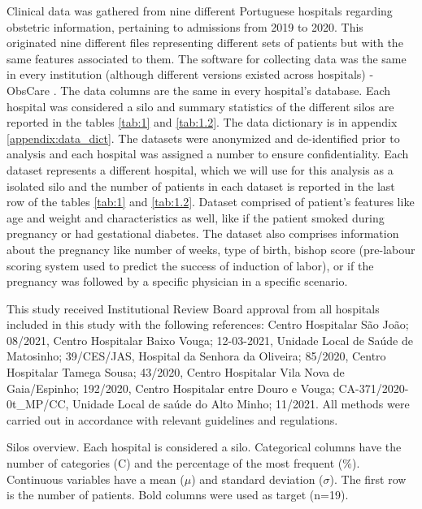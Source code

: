 
Clinical data was gathered from nine different Portuguese hospitals regarding obstetric information, pertaining to admissions from 2019 to 2020. This originated nine different files representing different sets of patients but with the same features associated to them. The software for collecting data was the same in every institution (although different versions existed across hospitals) - ObsCare \cite{obscare}. The data columns are the same in every hospital's database. Each hospital was considered a silo and summary statistics of the different silos are reported in the tables \ref{tab:1} and \ref{tab:1.2}. The data dictionary is in appendix \ref{appendix:data_dict}.
The datasets were anonymized and de-identified prior to analysis and each hospital was assigned a number to ensure confidentiality. Each dataset represents a different hospital, which we will use for this analysis as a isolated silo and the number of patients in each dataset is reported in the last row of the tables \ref{tab:1} and \ref{tab:1.2}. Dataset comprised of patient's features like age and weight and characteristics as well, like if the patient smoked during pregnancy or had gestational diabetes. The dataset also comprises information about the pregnancy like number of weeks, type of birth, bishop score (pre-labour scoring system used to predict the success of induction of labor), or if the pregnancy was followed by a specific physician in a specific scenario.

This study received Institutional Review Board approval from all hospitals included in this study with the following references: Centro Hospitalar São João; 08/2021, Centro Hospitalar Baixo Vouga; 12-03-2021, Unidade Local de Saúde de Matosinho; 39/CES/JAS, Hospital da Senhora da Oliveira; 85/2020, Centro Hospitalar Tamega Sousa; 43/2020, Centro Hospitalar Vila Nova de Gaia/Espinho; 192/2020, Centro Hospitalar entre Douro e Vouga; CA-371/2020-0t\_MP/CC, Unidade Local de saúde do Alto Minho; 11/2021.
All methods were carried out in accordance with relevant guidelines and regulations.

{\small
\begin{table}[h!]
\caption[Silos overview part 1]{\label{tab:1}Silos overview. Each hospital is considered a silo. Categorical columns have the number of categories (C) and the percentage of the most frequent (\%). Continuous variables have a mean ($\mu$) and standard deviation ($\sigma$).  The first row is the number of patients. Bold columns were used as target (n=19).}

\centering

\end{table}
}
\newpage

